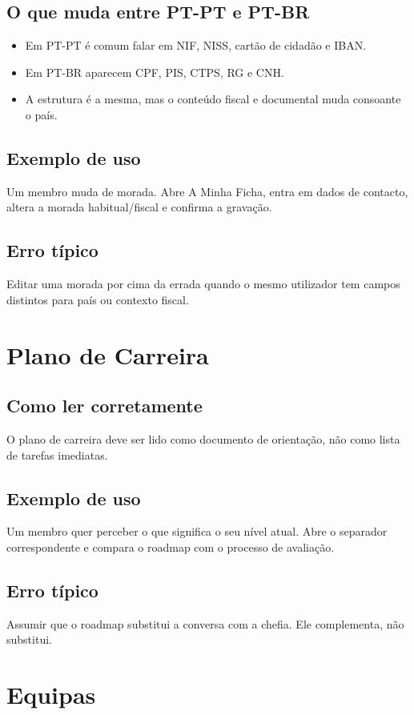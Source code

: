 \subsection{O que muda entre PT-PT e PT-BR}
\begin{itemize}
  \item Em PT-PT é comum falar em NIF, NISS, cartão de cidadão e IBAN.
  \item Em PT-BR aparecem CPF, PIS, CTPS, RG e CNH.
  \item A estrutura é a mesma, mas o conteúdo fiscal e documental muda consoante o país.
\end{itemize}

\subsection{Exemplo de uso}
Um membro muda de morada. Abre A Minha Ficha, entra em dados de contacto, altera a morada habitual/fiscal e confirma a gravação.

\subsection{Erro típico}
Editar uma morada por cima da errada quando o mesmo utilizador tem campos distintos para país ou contexto fiscal.

\section{Plano de Carreira}
\subsection{Como ler corretamente}
O plano de carreira deve ser lido como documento de orientação, não como lista de tarefas imediatas.

\subsection{Exemplo de uso}
Um membro quer perceber o que significa o seu nível atual. Abre o separador correspondente e compara o roadmap com o processo de avaliação.

\subsection{Erro típico}
Assumir que o roadmap substitui a conversa com a chefia. Ele complementa, não substitui.

\section{Equipas}

